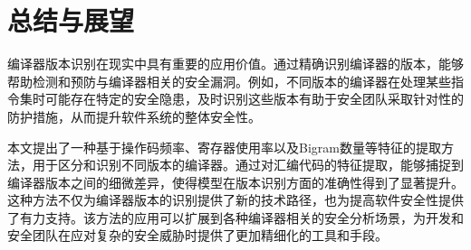 \section{总结与展望}
编译器版本识别在现实中具有重要的应用价值。通过精确识别编译器的版本，能够帮助检测和预防与编译器相关的安全漏洞。例如，不同版本的编译器在处理某些指令集时可能存在特定的安全隐患，及时识别这些版本有助于安全团队采取针对性的防护措施，从而提升软件系统的整体安全性。

本文提出了一种基于操作码频率、寄存器使用率以及Bigram数量等特征的提取方法，用于区分和识别不同版本的编译器。通过对汇编代码的特征提取，能够捕捉到编译器版本之间的细微差异，使得模型在版本识别方面的准确性得到了显著提升。这种方法不仅为编译器版本的识别提供了新的技术路径，也为提高软件安全性提供了有力支持。该方法的应用可以扩展到各种编译器相关的安全分析场景，为开发和安全团队在应对复杂的安全威胁时提供了更加精细化的工具和手段。